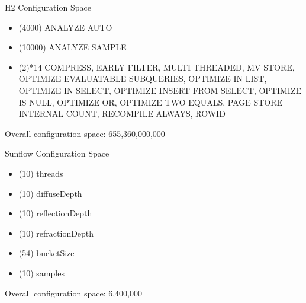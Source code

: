 \documentclass[11pt,aspectratio=169]{beamer}
\begin{document}
\begin{frame}{H2 Configuration Space}
  \begin{itemize}
    \item (4000) ANALYZE AUTO
    \item (10000) ANALYZE SAMPLE
    \item (2)*14 COMPRESS, EARLY FILTER, MULTI THREADED, MV STORE, OPTIMIZE EVALUATABLE SUBQUERIES, OPTIMIZE IN LIST, OPTIMIZE IN SELECT, OPTIMIZE INSERT FROM SELECT, OPTIMIZE IS NULL, OPTIMIZE OR, OPTIMIZE TWO EQUALS, PAGE STORE INTERNAL COUNT, RECOMPILE ALWAYS, ROWID
  \end{itemize}
  Overall configuration space: 655,360,000,000
\end{frame}

\begin{frame}{Sunflow Configuration Space}
  \begin{itemize}
    \item (10) threads
    \item (10) diffuseDepth
    \item (10) reflectionDepth
    \item (10) refractionDepth
    \item (54) bucketSize
    \item (10) samples
  \end{itemize}
  Overall configuration space: 6,400,000
\end{frame}

\appendix
\end{document}
